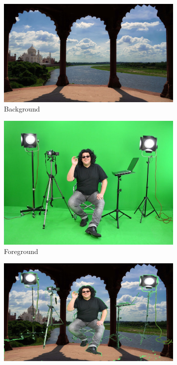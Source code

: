\documentclass[a4paper]{article}
\begin{document}
\begin{figure}[H]
    \hfill
    \centering
    \begin{subfigure}[b]{.3\textwidth}
        \centering
        \includegraphics[width=\textwidth]{media/tajmahal.jpg}
        \caption{Background}
    \end{subfigure}
    \hfill
    \begin{subfigure}[b]{.3\textwidth}
        \centering
        \includegraphics[width=\textwidth]{media/greenbox-director.jpg}
        \caption{Foreground}
    \end{subfigure}
    \hfill
    \begin{subfigure}[b]{.3\textwidth}
        \centering
        \includegraphics[width=\textwidth]{output/chroma_keying.jpg}

\end{subfigure}
\end{figure}
\end{document}
